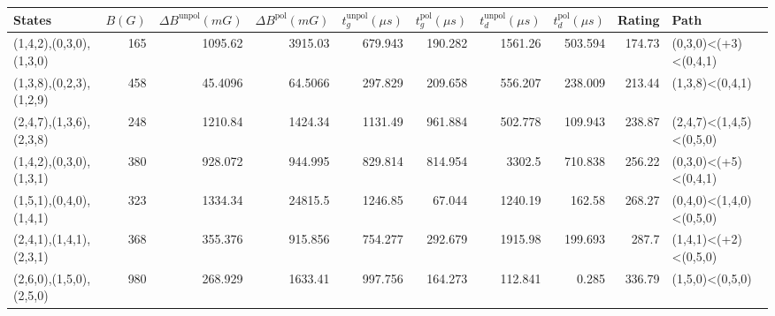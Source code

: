 \begin{tabular}{lrrrrrrrrl}
\hline
 {States}                &   {$B(G)$} &   {$\Delta B^{\text{unpol}}(mG)$} &   {$\Delta B^{\text{pol}}(mG)$} &   {$t^{\text{unpol}}_{g}(\mu s)$} &   {$t^{\text{pol}}_{g}(\mu s)$} &   {$t^{\text{unpol}}_{d}(\mu s)$} &   {$t^{\text{pol}}_{d}(\mu s)$} &   {Rating} & {Path}                  \\
\hline
 (1,4,2),(0,3,0),(1,3,0) &      165   &                        1095.62    &                       3915.03   &                           679.943 &                         190.282 &                          1561.26  &                         503.594 &     174.73 & (0,3,0)<(+3)<(0,4,1)    \\
 (1,3,8),(0,2,3),(1,2,9) &      458   &                          45.4096  &                         64.5066 &                           297.829 &                         209.658 &                           556.207 &                         238.009 &     213.44 & (1,3,8)<(0,4,1)         \\
 (2,4,7),(1,3,6),(2,3,8) &      248   &                        1210.84    &                       1424.34   &                          1131.49  &                         961.884 &                           502.778 &                         109.943 &     238.87 & (2,4,7)<(1,4,5)<(0,5,0) \\
 (1,4,2),(0,3,0),(1,3,1) &      380   &                         928.072   &                        944.995  &                           829.814 &                         814.954 &                          3302.5   &                         710.838 &     256.22 & (0,3,0)<(+5)<(0,4,1)    \\
 (1,5,1),(0,4,0),(1,4,1) &      323   &                        1334.34    &                      24815.5    &                          1246.85  &                          67.044 &                          1240.19  &                         162.58  &     268.27 & (0,4,0)<(1,4,0)<(0,5,0) \\
 (2,4,1),(1,4,1),(2,3,1) &      368   &                         355.376   &                        915.856  &                           754.277 &                         292.679 &                          1915.98  &                         199.693 &     287.7  & (1,4,1)<(+2)<(0,5,0)    \\
 (2,6,0),(1,5,0),(2,5,0) &      980   &                         268.929   &                       1633.41   &                           997.756 &                         164.273 &                           112.841 &                           0.285 &     336.79 & (1,5,0)<(0,5,0)         \\

\end{tabular}
